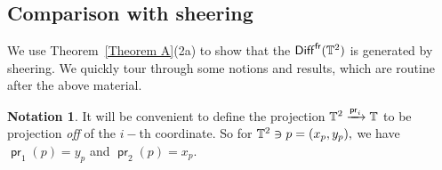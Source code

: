 \documentclass{amsart}
\theoremstyle{definition}
\newtheorem{notation}[theorem]{Notation}
\theoremstyle{remark}
\DeclareMathOperator{\pr}{\mathsf{pr}}
\DeclareMathOperator{\Diff}{{\sf Diff}}
\DeclareMathOperator{\fr}{\sf fr}
\newcommand{\xra}{\xrightarrow}
\begin{document}
\subsection{Comparison with sheering}
We use Theorem~\ref{Theorem A}(2a) to show that the $\Diff^{\fr}(\TT^2)$ is generated by sheering.  
We quickly tour through some notions and results, which are routine after the above material.  

\begin{notation}
It will be convenient to define the projection $\TT^{2} \xra{\pr_{i}} \TT$ to be projection \textit{off} of the $i-$th coordinate. So for $\mathbb T^{2} \ni p = (x_{p}, y_{p}),$ we have $\pr_{1}(p) = y_{p}$ and $\pr_{2}(p) = x_{p}.$
\end{notation}
\end{document}
